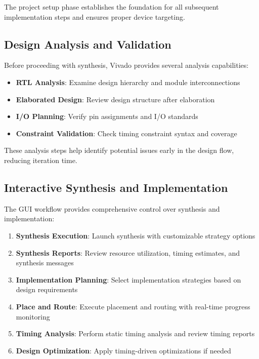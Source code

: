 The project setup phase establishes the foundation for all subsequent implementation steps and ensures proper device targeting.

\subsection{Design Analysis and Validation}

Before proceeding with synthesis, Vivado provides several analysis capabilities:

\begin{itemize}
    \item \textbf{RTL Analysis}: Examine design hierarchy and module interconnections
    \item \textbf{Elaborated Design}: Review design structure after elaboration
    \item \textbf{I/O Planning}: Verify pin assignments and I/O standards
    \item \textbf{Constraint Validation}: Check timing constraint syntax and coverage
\end{itemize}

These analysis steps help identify potential issues early in the design flow, reducing iteration time.

\subsection{Interactive Synthesis and Implementation}

The GUI workflow provides comprehensive control over synthesis and implementation:

\begin{enumerate}
    \item \textbf{Synthesis Execution}: Launch synthesis with customizable strategy options
    \item \textbf{Synthesis Reports}: Review resource utilization, timing estimates, and synthesis messages
    \item \textbf{Implementation Planning}: Select implementation strategies based on design requirements
    \item \textbf{Place and Route}: Execute placement and routing with real-time progress monitoring
    \item \textbf{Timing Analysis}: Perform static timing analysis and review timing reports
    \item \textbf{Design Optimization}: Apply timing-driven optimizations if needed
\end{enumerate}

